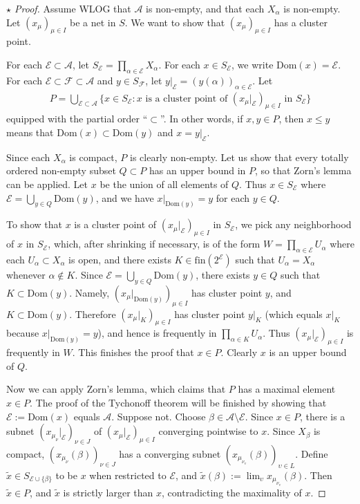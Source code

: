 \documentclass[12pt,b5paper,notitlepage]{article}
\theoremstyle{definition}
\theoremstyle{plain}
\newcommand{\wtd}{\widetilde}
\newcommand{\Domain}{\mathrm{Dom}}
\newcommand{\scr}{\mathscr}
\newcommand{\fin}{\mathrm{fin}}
\numberwithin{equation}{section}
\begin{document}
\begin{proof}[$\star$ Proof]
Assume WLOG that $\scr A$ is non-empty, and that each $X_\alpha$ is non-empty. Let $(x_\mu)_{\mu\in I}$ be a net in $S$. We want to show that $(x_\mu)_{\mu\in I}$ has a cluster point.

For each $\scr E\subset\scr A$, let $S_{\scr E}=\prod_{\alpha\in\scr E}X_\alpha$. For each $x\in S_{\scr E}$, we write $\Domain(x)=\scr E$.  For each $\scr E\subset\scr F\subset\scr A$ and $y\in S_{\scr F}$, let $y|_{\scr E}=(y(\alpha))_{\alpha\in\scr E}$. Let
\begin{align*}
P=\bigcup_{\scr E\subset\scr A}\big\{x\in S_{\scr E}:x\text{ is a cluster point of $(x_\mu|_{\scr E})_{\mu\in I}$ in $S_{\scr E}$} \big\}
\end{align*} 
equipped with the partial order ``$\subset$''. In other words, if $x,y\in P$, then $x\leq y$ means that $\Domain(x)\subset\Domain(y)$ and $x=y|_{\scr E}$.

Since each $X_\alpha$ is compact, $P$ is clearly non-empty. Let us show that every totally ordered non-empty subset $Q\subset P$ has an upper bound in $P$, so that Zorn's lemma can be applied. Let $x$ be the union of all elements of $Q$. Thus $x\in S_{\scr E}$ where $\scr E=\bigcup_{y\in Q}\Domain(y)$, and we have $x|_{\Domain(y)}=y$ for each $y\in Q$. 

To show that $x$ is a cluster point of $(x_\mu|_{\scr E})_{\mu\in I}$ in $S_{\scr E}$, we pick any neighborhood of $x$ in $S_{\scr E}$, which, after shrinking if necessary, is of the form $W=\prod_{\alpha\in\scr E}U_\alpha$ where each $U_\alpha\subset X_\alpha$ is open, and there exists $K\in\fin(2^{\scr E})$ such that $U_\alpha=X_\alpha$ whenever $\alpha\notin K$. Since $\scr E=\bigcup_{y\in Q}\Domain(y)$, there exists $y\in Q$ such that $K\subset\Domain(y)$. Namely,   $(x_\mu|_{\Domain(y)})_{\mu\in I}$ has cluster point $y$, and $K\subset\Domain(y)$. Therefore $(x_\mu|_K)_{\mu\in I}$ has cluster point $y|_K$ (which equals $x|_K$ because $x|_{\Domain(y)}=y$), and hence is frequently in $\prod_{\alpha\in K}U_\alpha$. Thus $(x_\mu|_{\scr E})_{\mu\in I}$ is frequently in $W$. This finishes the proof that $x\in P$. Clearly $x$ is an upper bound of $Q$.

Now we can apply Zorn's lemma, which claims that $P$ has a maximal element $x\in P$. The proof of the Tychonoff theorem will be finished by showing that $\scr E:=\Domain(x)$ equals $\scr A$. Suppose not. Choose $\beta\in\scr A\setminus\scr E$. Since $x\in P$, there is a subnet $(x_{\mu_\nu}|_{\scr E})_{\nu\in J}$ of $(x_\mu|_{\scr E})_{\mu\in I}$ converging pointwise to $x$. Since $X_\beta$ is compact, $(x_{\mu_\nu}(\beta))_{\nu\in J}$ has a converging subnet $(x_{\mu_{\nu_\upsilon}}(\beta))_{\upsilon\in L}$. Define $\wtd x\in S_{\scr E\cup\{\beta\}}$ to be $x$ when restricted to $\scr E$, and $\wtd x(\beta):=\lim_\upsilon x_{\mu_{\nu_\upsilon}}(\beta)$. Then $\wtd x\in P$, and $\wtd x$ is strictly larger than $x$, contradicting the maximality of $x$.
\end{proof}
\end{document}
